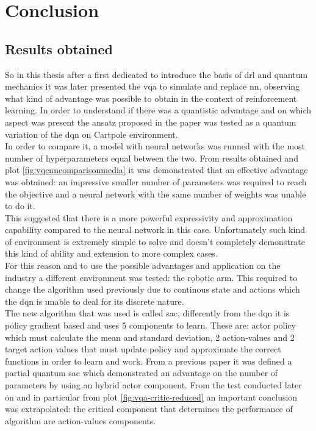\section{Conclusion}
\subsection{Results obtained}
So in this thesis after a first dedicated to introduce the basis of \acrlong{drl} and quantum mechanics it was later presented the \acrlong{vqa} to simulate and replace \acrlong{nn}, observing what kind of advantage was possible to obtain in the context of reinforcement learning.
In order to understand if there was a quantistic advantage and on which aspect was present the ansatz proposed in the paper \cite{Scholik_2022} was tested as a quantum variation of the \acrlong{dqn} on Cartpole environment.\\
In order to compare it, a model with neural networks was runned with the most number of hyperparameters equal between the two. From results obtained and plot \ref{fig:vqcnncomparisonmedia} it was demonstrated that an effective advantage was obtained: an impressive smaller number of parameters was required to reach the objective and a neural network with the same number of weights was unable to do it.\\
This suggested that there is a more powerful expressivity and approximation capability compared to the neural network in this case. Unfortunately such kind of environment is extremely simple to solve and doesn't completely demonstrate this kind of ability and extension to more complex cases.\\
For this reason and to use the possible advantages and application on the industry a different  environment was tested: the robotic arm. This required to change the algorithm used previously due to continous state and actions which the \acrshort{dqn} is unable to deal for its discrete nature.\\
The new algorithm that was used is called \acrfull{sac}, differently from the \acrshort{dqn} it is policy gradient based and uses 5 components to learn. These are: actor policy which must calculate the mean and standard deviation, 2 action-values and 2 target action values that must update policy and approximate the correct functions in order to learn and work.
From a previous paper \cite{https://doi.org/10.48550/arxiv.2112.11921} it was defined a partial quantum \acrshort{sac} which demonstrated an advantage on the number of parameters by using an hybrid actor component. From the test conducted later on and in particular from plot \ref{fig:vqa-critic-reduced} an important conclusion was extrapolated: the critical component  that determines the performance of algorithm are action-values components.
